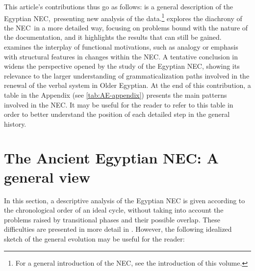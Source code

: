 \documentclass[output=paper,draft,draftmode,colorlinks,citecolor=brown]{langscibook}
\begin{document}
This article’s contributions thus go as follows:  is a general description of the Egyptian NEC, presenting new analysis of the data.\footnote{ For a general introduction of the NEC, see the introduction of this volume.}  explores the diachrony of the NEC in a more detailed way, focusing on problems bound with the nature of the documentation, and it highlights the results that can still be gained.  examines the interplay of functional motivations, such as analogy or emphasis with structural features in changes within the NEC. A tentative conclusion in  widens the perspective opened by the study of the Egyptian NEC, showing its relevance to the larger understanding of grammaticalization paths involved in the renewal of the verbal system in Older Egyptian. At the end of this contribution, a table in the Appendix (see \ref{tab:AE-appendix}) presents the main patterns involved in the NEC. It may be useful for the reader to refer to this table in order to better understand the position of each detailed step in the general history.


\section{The Ancient Egyptian NEC: A general view}\label{s:AE2}

In this section, a descriptive analysis of the Egyptian NEC is given according to the chronological order of an ideal cycle, without taking into account the problems raised by transitional phases and their possible overlap. These difficulties are presented in more detail in . However, the following idealized sketch of the general evolution may be useful for the reader:
\end{document}
